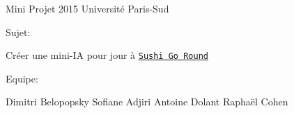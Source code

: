 Mini Projet 2015 Université Paris-\/\+Sud

Sujet\+:

Créer une mini-\/\+I\+A pour jour à \href{http://www.miniclip.com/games/sushi-go-round/en/}{\tt Sushi Go Round}

Equipe\+:

Dimitri Belopopsky Sofiane Adjiri Antoine Dolant Raphaël Cohen 